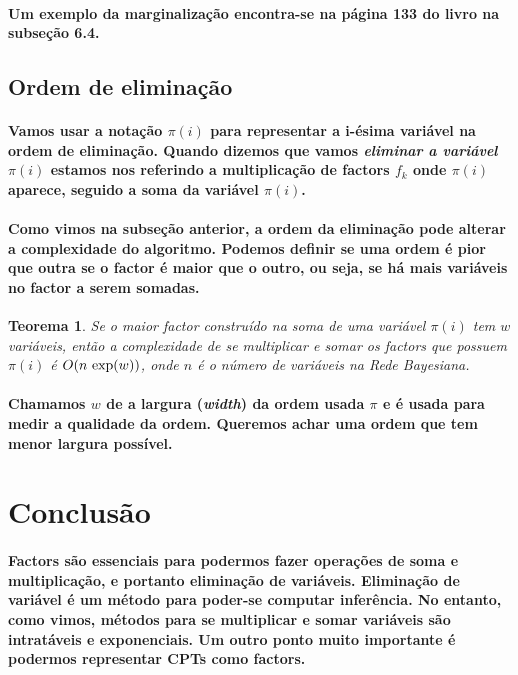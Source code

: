 \documentclass[a4paper,10pt]{article}
\theoremstyle{plain}
\newtheorem*{spn-thm}{Teorema}
\begin{document}
\paragraph{
  Um exemplo da marginalização encontra-se na página 133 do livro\cite{bayes-net-darwiche} na
subseção 6.4.
}

\subsection{Ordem de eliminação}

\paragraph{
  Vamos usar a notação $\pi(i)$ para representar a i-ésima variável na ordem de eliminação. Quando
dizemos que vamos \textit{eliminar a variável} $\pi(i)$ estamos nos referindo a multiplicação de 
factors $f_k$ onde $\pi(i)$ aparece, seguido a soma da variável $\pi(i)$.
}

\paragraph{
  Como vimos na subseção anterior, a ordem da eliminação pode alterar a complexidade do algoritmo.
Podemos definir se uma ordem é pior que outra se o factor é maior que o outro, ou seja, se há mais
variáveis no factor a serem somadas.
}

\begin{spn-thm} Se o maior factor construído na soma de uma variável $\pi(i)$ tem $w$ variáveis, 
  então a complexidade de se multiplicar e somar os factors que possuem $\pi(i)$ é $O(n  
  \textnormal{ exp}(w))$, onde $n$ é o número de variáveis na Rede Bayesiana.
\end{spn-thm}

\paragraph{
  Chamamos $w$ de a largura (\textit{width}) da ordem usada $\pi$ e é usada para medir a qualidade
da ordem. Queremos achar uma ordem que tem menor largura possível.
}

\section{Conclusão}

\paragraph{
  Factors são essenciais para podermos fazer operações de soma e multiplicação, e portanto 
eliminação de variáveis. Eliminação de variável é um método para poder-se computar inferência. No
entanto, como vimos, métodos para se multiplicar e somar variáveis são intratáveis e exponenciais.
Um outro ponto muito importante é podermos representar CPTs como factors.
}

\newpage

\printbibliography
\end{document}
